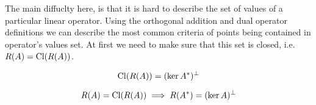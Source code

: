 The main diffuclty here, is that it is hard to describe the set of values of a
particular linear operator.
Using the orthogonal addition and dual operator definitions we can describe the
most common criteria of points being contained in operator's values set. At first we need to
make sure that this set is closed, i.e. $R(A) = \operatorname{Cl}({R(A)})$.

\begin{thm}[1]
  \[
    \operatorname{Cl}({R(A)}) = (\ker{A^*})^\perp
  \]
\end{thm}

\begin{thm}[2]
  \[
    R(A) = \operatorname{Cl}({R(A)}) \implies R(A^*) = (\ker{A})^\perp
  \]
\end{thm}
